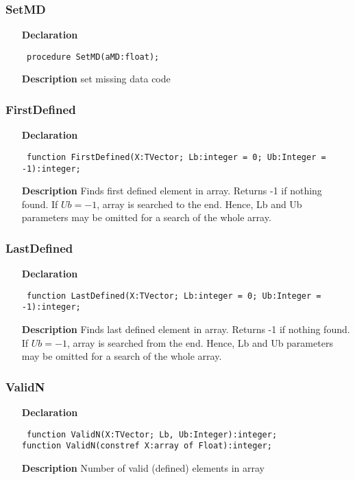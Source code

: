 \documentclass[12pt,a4paper,oneside]{report}
\newcommand{\declarationitem}[1]{\textbf{#1}}
\newcommand{\descriptiontitle}[1]{\textbf{#1}}
\newcommand{\code}[1]{\texttt{#1}}
\begin{document}
\subsubsection{SetMD}
\label{umeansd_md-SetMD}
\begin{itemize}\item[\declarationitem{Declaration}\hfill]
	\begin{flushleft}
		\code{
			procedure SetMD(aMD:float);}
	\end{flushleft}
	\item[\descriptiontitle{Description}]
	set missing data code
\end{itemize}
\subsubsection{FirstDefined}
\label{umeansd_md-FirstDefined}
\begin{itemize}\item[\declarationitem{Declaration}\hfill]
	\begin{flushleft}
		\code{
			function FirstDefined(X:TVector; Lb:integer = 0; Ub:Integer = -1):integer;}
	\end{flushleft}
	\item[\descriptiontitle{Description}]
	Finds first defined element in array. Returns -1 if nothing found. If $Ub = -1$, array is searched to the end. Hence, Lb and Ub parameters may be omitted for a search of the whole array.
\end{itemize}
\subsubsection{LastDefined}
\label{umeansd_md-LastDefined}
\begin{itemize}\item[\declarationitem{Declaration}\hfill]
	\begin{flushleft}
		\code{
			function LastDefined(X:TVector; Lb:integer = 0; Ub:Integer = -1):integer;}
	\end{flushleft}
	\item[\descriptiontitle{Description}]
	Finds last defined element in array. Returns -1 if nothing found. If $Ub = -1$, array is searched from the end. Hence, Lb and Ub parameters may be omitted for a search of the whole array.
\end{itemize}
\subsubsection{ValidN}
\label{umeansd_md-ValidN}
\begin{itemize}\item[\declarationitem{Declaration}\hfill]
	\begin{flushleft}
		\code{
			function ValidN(X:TVector; Lb, Ub:Integer):integer;}\\
		\code{function ValidN(constref X:array of Float):integer;}
	\end{flushleft}
	\item[\descriptiontitle{Description}]
	Number of valid (defined) elements in array
\end{itemize}
\end{document}
